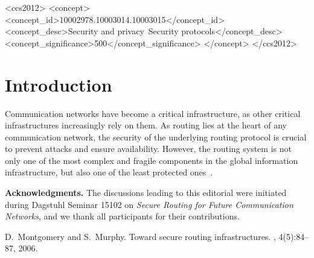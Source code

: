 \documentclass{sig-alternate-05-2015}
\begin{document}
\begin{CCSXML}
<ccs2012>
<concept>
<concept_id>10002978.10003014.10003015</concept_id>
<concept_desc>Security and privacy~Security protocols</concept_desc>
<concept_significance>500</concept_significance>
</concept>
</ccs2012>
\end{CCSXML}


\printccsdesc



\section{Introduction}\label{sec:intro}

Communication networks have become a critical infrastructure, as other critical
infrastructures increasingly rely on them.
As routing lies at the heart of 
any communication network,
the security of the underlying 
routing protocol is crucial
to prevent attacks and ensure availability.
However, the routing system is not only one
of the most complex and fragile components in the
global information infrastructure, but also 
one of the least protected ones~\cite{route-infra}.


\noindent \textbf{Acknowledgments.} The discussions
leading to this editorial were initiated during
Dagstuhl Seminar 15102 on 
\emph{Secure Routing for Future Communication Networks},
and we thank all participants for their contributions. 

{ \balance
{
%
%
\begin{thebibliography}{1}

D.~Montgomery and S.~Murphy.
\newblock Toward secure routing infrastructures.
, 4(5):84--87, 2006.

\end{thebibliography}
}
}
\end{document}
